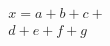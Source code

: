 \documentclass{article}
\begin{document}
\begin{multline}
x = a+b+c+{} \\
d+e+f+g
\end{multline}
\end{document}

